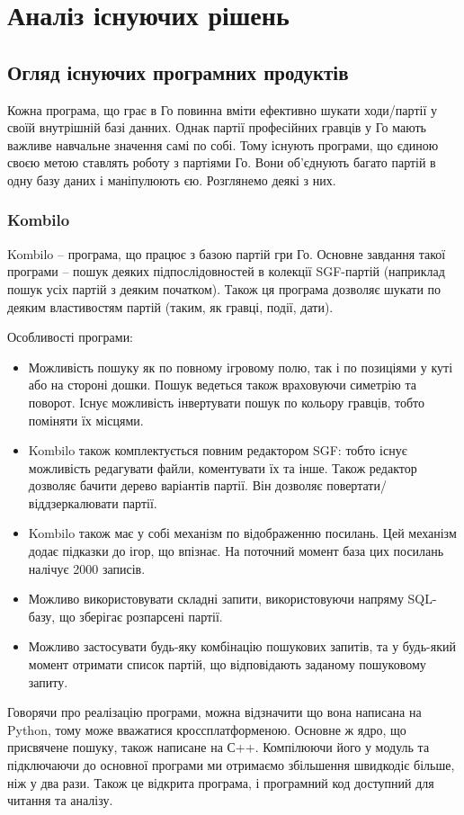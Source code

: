 \chapter{Аналіз існуючих рішень}
\section{Огляд існуючих програмних продуктів}
Кожна програма, що грає в Го повинна вміти ефективно шукати ходи/партії у своїй внутрішній базі данних. Однак партії професійних гравців у Го мають важливе навчальне значення самі по собі. Тому існують програми, що єдиною своєю метою ставлять роботу з партіями Го. Вони об'єднують багато партій в одну базу даних і маніпулюють єю. Розглянемо деякі з них.

\subsection{Kombilo}
Kombilo -- програма, що працює з базою партій гри Го. Основне завдання такої програми -- пошук деяких підпослідовностей в колекції SGF-партій (наприклад пошук усіх партій з деяким початком). Також ця програма дозволяє шукати по деяким властивостям партій (таким, як гравці, події, дати).

Особливості програми:
\begin{itemize}
	\item Можливість пошуку як по повному ігровому полю, так і по позиціями у куті або на стороні дошки. Пошук ведеться також враховуючи симетрію та поворот. Існує можливість інвертувати пошук по кольору гравців, тобто поміняти їх місцями.
	\item Kombilo також комплектується повним редактором SGF: тобто існує можливість редагувати файли, коментувати їх та інше. Також редактор дозволяє бачити дерево варіантів партії. Він дозволяє повертати/віддзеркалювати партії.
	\item Kombilo також має у собі механізм по відображенню посилань. Цей механізм додає підказки до ігор, що впізнає. На поточний момент база цих посилань налічує 2000 записів.
	\item Можливо використовувати складні запити, використовуючи напряму SQL-базу, що зберігає розпарсені партії.
	\item Можливо застосувати будь-яку комбінацію пошукових запитів, та у будь-який момент отримати список партій, що відповідають заданому пошуковому запиту.
\end{itemize}

Говорячи про реалізацію програми, можна відзначити що вона написана на Python, тому може вважатися кроссплатформеною. Основне ж ядро, що присвячене пошуку, також написане на С++. Компілюючи його у модуль та підключаючи до основної програми ми отримаємо збільшення швидкодіє більше, ніж у два рази. Також це відкрита програма, і програмний код доступний для читання та аналізу.
